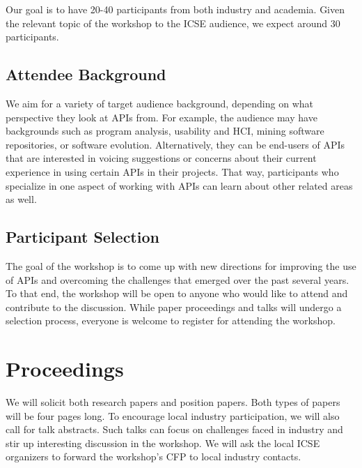 \documentclass[10pt, conference]{IEEEtran}
\begin{document}
Our goal is to have 20-40 participants from both industry and academia. Given the relevant topic of the workshop to the ICSE audience, we expect around 30 participants.

\subsection{Attendee Background} 
We aim for a variety of target audience background, depending on what perspective they look at APIs from. For example, the audience may have backgrounds such as program analysis, usability and HCI, mining software repositories, or software evolution. Alternatively, they can be end-users of APIs that are interested in voicing suggestions or concerns about their current experience in using certain APIs in their projects. That way, participants who specialize in one aspect of working with APIs can learn about other related areas as well.

\subsection{Participant Selection}
The goal of the workshop is to come up with new directions for improving the use of APIs and overcoming the challenges that emerged over the past several years. To that end, the workshop will be open to anyone who would like to attend and contribute to the discussion. While paper proceedings and talks will undergo a selection process, everyone is welcome to register for attending the workshop. 

\section{Proceedings}

We will solicit both research papers and position papers. Both types of papers will be four pages long. To encourage local industry participation, we will also call for talk abstracts. Such talks can focus on challenges faced in industry and stir up interesting discussion in the workshop. We will ask the local ICSE organizers to forward the workshop's CFP to local industry contacts.
\end{document}
